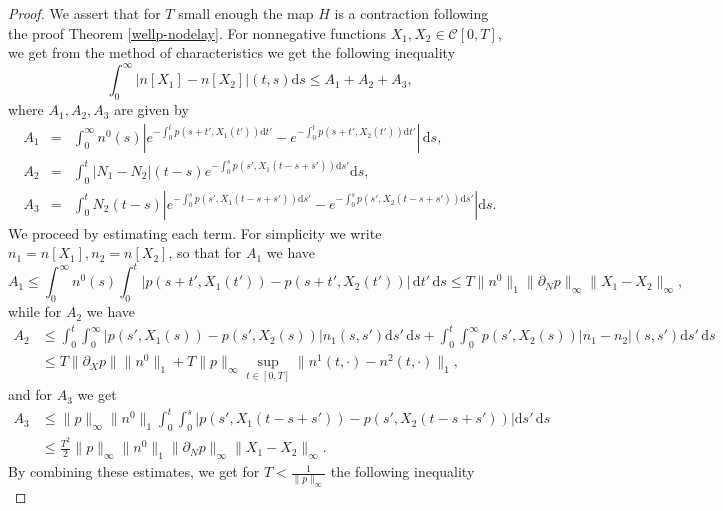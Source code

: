 \documentclass[11pt,a4paper]{article}
\newcommand{\dd}{\mathrm{d}}
\begin{document}
\begin{proof}
    We assert that for $T$ small enough the map $H$ is a contraction following the proof Theorem \ref{wellp-nodelay}. For nonnegative functions $X_1,X_2\in\mathcal{C}[0,T]$, we get from the method of characteristics we get the following inequality
\begin{equation*}
    \int_0^\infty |n[X_1]-n[X_2]|(t,s)\dd s\le A_1+A_2+A_3,    
\end{equation*}
    where $A_1,A_2,A_3$ are given by
    \begin{eqnarray*}
        A_1&=&\int_0^\infty n^0(s)\left|e^{-\int_0^t p(s+t',X_1(t'))\dd t'}-e^{-\int_0^t p(s+t',X_2(t'))\dd t'}\right|\,\dd s,\\
        A_2&=&\int_0^t |N_1-N_2|(t-s) e^{-\int_0^s p(s',X_1(t-s+s'))\dd s'}\dd s,\\
        A_3&=&\int_0^t N_2(t-s)\left|e^{-\int_0^s p(s',X_1(t-s+s'))\dd s'}-e^{-\int_0^s p(s',X_2(t-s+s'))\dd s'} \right|\dd s.
    \end{eqnarray*}
    We proceed by estimating each term. For simplicity we write $n_1=n[X_1],n_2=n[X_2]$, so that for $A_1$ we have
 \begin{equation*}
    A_1\le \int_0^\infty n^0(s)\int_0^t|p(s+t',X_1(t'))-p(s+t',X_2(t'))|\,\dd t'\,\dd s \le T\|n^0\|_1 \|\partial_N p\|_\infty \|X_1-X_2\|_\infty,
 \end{equation*}
    while for $A_2$ we have
    \begin{equation*}
        \begin{split}
           A_2 & \le \int_0^t\int_0^\infty|p(s',X_1(s))-p(s',X_2(s))|n_1(s,s')\dd s'\,\dd s+\int_0^t\int_0^\infty p(s',X_2(s))|n_1-n_2|(s,s')\dd s'\,\dd s\\
           &\le T\|\partial_X p\|\|n^0\|_1 + T\|p\|_\infty\sup_{t\in[0,T]}\|n^1(t,\cdot)-n^2(t,\cdot)\|_1,
        \end{split}
    \end{equation*}
    and for $A_3$ we get
    \begin{equation*}
    \begin{split}
        A_3 &\le \|p\|_\infty\|n^0\|_1 \int_0^t\int_0^s|p(s',X_1(t-s+s'))-p(s',X_2(t-s+s'))|\dd s'\,\dd s\\
        &\le\frac{T^2}{2} \|p\|_\infty\|n^0\|_1\|\partial_N p\|_\infty\|X_1-X_2\|_\infty. 
    \end{split}
    \end{equation*}
    By combining these estimates, we get for $T<\frac{1}{\|p\|_\infty}$  the following inequality
    \begin{equation}

\end{equation}
\end{proof}
\end{document}
